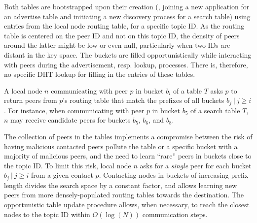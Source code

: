 
Both tables are bootstrapped upon their creation (\ie, joining a new application for an advertise table and initiating a new discovery process for a search table) using entries from the local node routing table, for a specific topic ID.
As the routing table is centered on the peer ID and not on this topic ID, the density of peers around the latter might be low or even null, particularly when two IDs are distant in the key space.
The buckets are filled opportunistically while interacting with peers during the advertisement, resp. lookup, processes.
There is, therefore, no specific DHT lookup for filling in the entries of these tables.

A local node $n$ communicating with peer $p$ in bucket $b_i$ of a table $T$ asks $p$ to return peers from $p$'s routing table that match the prefixes of all buckets $b_j \:|\: j \geq i$.
For instance, when communicating with peer $p$ in bucket $b_{5}$ of a search table $T$, $n$ may receive candidate peers for buckets $b_5$, $b_6$, and $b_8$.

The collection of peers in the tables implements a compromise between the risk of having malicious contacted peers pollute the table or a specific bucket with a majority of malicious peers, and the need to learn ``rare'' peers in buckets close to the topic ID.
To limit this risk, local node $n$ asks for a \emph{single} peer for each bucket $b_j \:|\: j \geq i$ from a given contact $p$.
Contacting nodes in buckets of increasing prefix length divides the search space by a constant factor, and allows learning new peers from more densely-populated routing tables towards the destination.
The opportunistic table update procedure allows, when necessary, to reach the closest nodes to the topic ID within $O(\log(N))$ communication steps.

